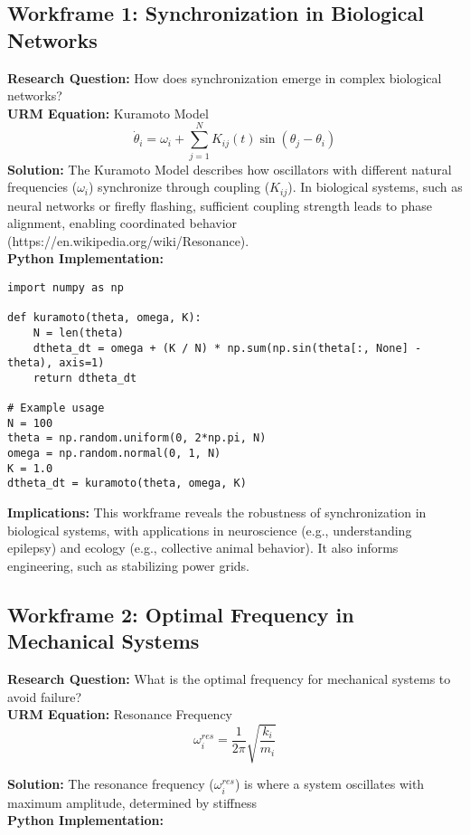 \documentclass[12pt]{article}
\begin{document}
\subsection{Workframe 1: Synchronization in Biological Networks}
\textbf{Research Question:} How does synchronization emerge in complex biological networks? \\
\textbf{URM Equation:} Kuramoto Model
\[
\dot{\theta}_i = \omega_i + \sum_{j=1}^N K_{ij}(t) \sin(\theta_j - \theta_i)
\]
\textbf{Solution:} The Kuramoto Model describes how oscillators with different natural frequencies (\(\omega_i\)) synchronize through coupling (\(K_{ij}\)). In biological systems, such as neural networks or firefly flashing, sufficient coupling strength leads to phase alignment, enabling coordinated behavior \cite{Resonance - Wikipedia}(https://en.wikipedia.org/wiki/Resonance). \\
\textbf{Python Implementation:}
\begin{lstlisting}[caption={Kuramoto Model Simulation}]
import numpy as np

def kuramoto(theta, omega, K):
    N = len(theta)
    dtheta_dt = omega + (K / N) * np.sum(np.sin(theta[:, None] - theta), axis=1)
    return dtheta_dt

# Example usage
N = 100
theta = np.random.uniform(0, 2*np.pi, N)
omega = np.random.normal(0, 1, N)
K = 1.0
dtheta_dt = kuramoto(theta, omega, K)
\end{lstlisting}
\textbf{Implications:} This workframe reveals the robustness of synchronization in biological systems, with applications in neuroscience (e.g., understanding epilepsy) and ecology (e.g., collective animal behavior). It also informs engineering, such as stabilizing power grids.

\clearpage
\subsection{Workframe 2: Optimal Frequency in Mechanical Systems}

\textbf{Research Question:} What is the optimal frequency for mechanical systems to avoid failure? \\
\textbf{URM Equation:} Resonance Frequency
\[
\omega_i^{res} = \frac{1}{2\pi} \sqrt{\frac{k_i}{m_i}}
\]

\textbf{Solution:} The resonance frequency (\(\omega_i^{res}\)) is where a system oscillates with maximum amplitude, determined by stiffness  \\

\textbf{Python Implementation:}
\end{document}
